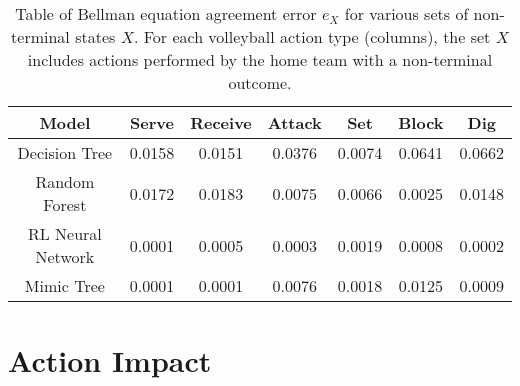 \documentclass{sfuthesis}
\begin{document}
\begin{table}[]
	\centering
	\begin{tabular}{c|cccccc}
		\textbf{Model}    & \textbf{Serve} & \textbf{Receive} & \textbf{Attack} & \textbf{Set} & \textbf{Block} & \textbf{Dig} \\ \hline
		Decision Tree     & 0.0158                  & 0.0151                    & 0.0376                   & 0.0074                & 0.0641                  & 0.0662                \\
		Random Forest     & 0.0172                  & 0.0183                    & 0.0075                   & 0.0066                & 0.0025                  & 0.0148                \\
		RL Neural Network & 0.0001                  & 0.0005                    & 0.0003                   & 0.0019                & 0.0008                  & 0.0002                \\
		Mimic Tree        & 0.0001                  & 0.0001                    & 0.0076                   & 0.0018                & 0.0125                  & 0.0009               
	\end{tabular}
	\caption{Table of Bellman equation agreement error $e_X$ for various sets of non-terminal states $X$. For each volleyball action type (columns), the set $X$ includes actions performed by the home team with a non-terminal outcome.}
	\label{tab:bellman-agreement}
\end{table}

\section{Action Impact}
\end{document}
